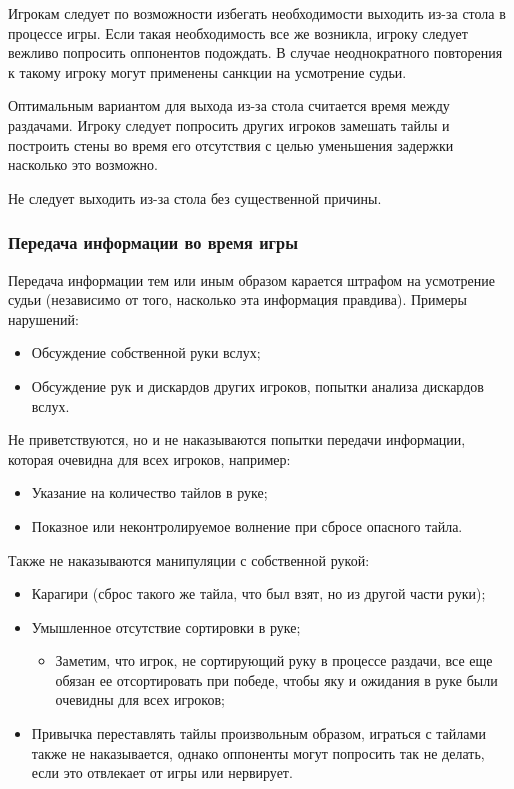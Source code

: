 Игрокам следует по возможности избегать необходимости выходить из-за стола в процессе игры. Если такая необходимость все же возникла, игроку следует вежливо попросить оппонентов подождать. В случае неоднократного повторения к такому игроку могут применены санкции на усмотрение судьи.

Оптимальным вариантом для выхода из-за стола считается время между раздачами. Игроку следует попросить других игроков замешать тайлы и построить стены во время его отсутствия с целью уменьшения задержки насколько это возможно.

Не следует выходить из-за стола без существенной причины.

\subsubsection{Передача информации во время игры}

Передача информации тем или иным образом карается штрафом на усмотрение судьи (независимо от того, насколько эта информация правдива). Примеры нарушений:
\begin{itemize}
	\item Обсуждение собственной руки вслух;
	\item Обсуждение рук и дискардов других игроков, попытки анализа дискардов вслух.
\end{itemize}

Не приветствуются, но и не наказываются попытки передачи информации, которая очевидна для всех игроков, например:
\begin{itemize}
	\item Указание на количество тайлов в руке;
	\item Показное или неконтролируемое волнение при сбросе опасного тайла.
\end{itemize}

Также не наказываются манипуляции с собственной рукой:
\begin{itemize}
	\item Карагири (сброс такого же тайла, что был взят, но из другой части руки);
	\item Умышленное отсутствие сортировки в руке;
	\begin{itemize}
		\item Заметим, что игрок, не сортирующий руку в процессе раздачи, все еще обязан ее отсортировать при победе, чтобы яку и ожидания в руке были очевидны для всех игроков;
	\end{itemize}
	\item Привычка переставлять тайлы произвольным образом, играться с тайлами также не наказывается, однако оппоненты могут попросить так не делать, если это отвлекает от игры или нервирует.
\end{itemize}

